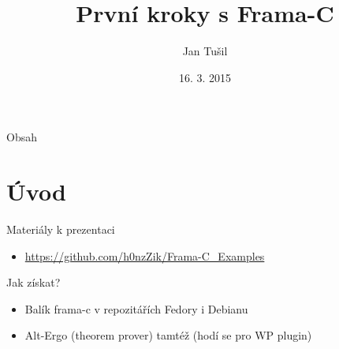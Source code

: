 \documentclass[11pt]{beamer}
\author{Jan Tušil}
\title{První kroky s Frama-C}
\date{16. 3. 2015}
\begin{document}
\begin{frame}
\titlepage
\end{frame}

\begin{frame}{Obsah}
\tableofcontents[]
\end{frame}

\section{Úvod}

\begin{frame}{Materiály k prezentaci}
\begin{itemize}
	\item \url{https://github.com/h0nzZik/Frama-C_Examples}
\end{itemize}
\end{frame}

\begin{frame}{Jak získat?}
	\begin{itemize}
		\item Balík frama-c v repozitářích Fedory i Debianu
		\item Alt-Ergo (theorem prover) tamtéž (hodí se pro WP plugin)
	\end{itemize}
\end{frame}
\end{document}
